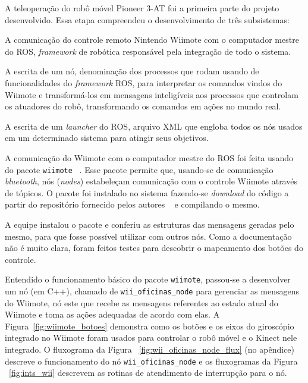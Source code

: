 A teleoperação do robô móvel Pioneer 3-AT foi a primeira parte do projeto desenvolvido. Essa etapa compreendeu o desenvolvimento de três subsistemas:

\begin{compactitem}
\item A comunicação do controle remoto Nintendo Wiimote com o computador mestre do ROS, \textit{framework} de robótica responsável pela integração de todo o sistema.
\item A escrita de um nó, denominação dos processos que rodam usando de funcionalidades do \textit{framework} ROS, para interpretar os comandos vindos do Wiimote e transformá-los em mensagens inteligíveis aos processos que controlam os atuadores do robô, transformando os comandos em ações no mundo real.
\item A escrita de um \textit{launcher} do ROS, arquivo XML que engloba todos os nós usados em um determinado sistema para atingir seus objetivos.
\end{compactitem}

A comunicação do Wiimote com o computador mestre do ROS foi feita usando do pacote \verb|wiimote| ~\cite{wiimote}. Esse pacote permite que, usando-se de comunicação \textit{bluetooth}, nós (\textit{nodes}) estabeleçam comunicação com o controle Wiimote através de tópicos. O pacote foi instalado no sistema fazendo-se \textit{download} do código a partir do repositório fornecido pelos autores ~\cite{gitwiimote} e compilando o mesmo.

A equipe instalou o pacote e conferiu as estruturas das mensagens geradas pelo mesmo, para que fosse possível utilizar com outros nós. Como a documentação não é muito clara, foram feitos testes para descobrir o mapeamento dos botões do controle. 

Entendido o funcionamento básico do pacote \verb|wiimote|, passou-se a desenvolver um nó (em C++), chamado de \verb|wii_oficinas_node| para gerenciar as mensagens do Wiimote, nó este que recebe as mensagens referentes ao estado atual do Wiimote e toma as ações adequadas de acordo com elas. A Figura~\ref{fig:wiimote_botoes} demonstra como os botões e os eixos do giroscópio integrado no Wiimote foram usados para controlar o robô móvel e o Kinect nele integrado. O fluxograma da Figura ~\ref{fig:wii_oficinas_node_flux} (no apêndice) descreve o funcionamento do nó \verb|wii_oficinas_node| e os fluxogramas da Figura ~\ref{fig:ints_wii} descrevem as rotinas de atendimento de interrupção para o nó.

